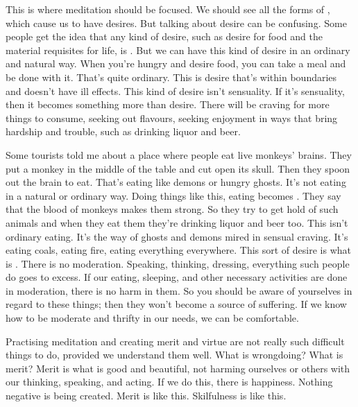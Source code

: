 This is where meditation should be focused. We should see all the forms of , which cause us to have desires. But talking about desire can be confusing. Some people get the idea that any kind of desire, such as desire for food and the material requisites for life, is . But we can have this kind of desire in an ordinary and natural way. When you're hungry and desire food, you can take a meal and be done with it. That's quite ordinary. This is desire that's within boundaries and doesn't have ill effects. This kind of desire isn't sensuality. If it's sensuality, then it becomes something more than desire. There will be craving for more things to consume, seeking out flavours, seeking enjoyment in ways that bring hardship and trouble, such as drinking liquor and beer. 

Some tourists told me about a place where people eat live monkeys' brains. They put a monkey in the middle of the table and cut open its skull. Then they spoon out the brain to eat. That's eating like demons or hungry ghosts. It's not eating in a natural or ordinary way. Doing things like this, eating becomes . They say that the blood of monkeys makes them strong. So they try to get hold of such animals and when they eat them they're drinking liquor and beer too. This isn't ordinary eating. It's the way of ghosts and demons mired in sensual craving. It's eating coals, eating fire, eating everything everywhere. This sort of desire is what is . There is no moderation. Speaking, thinking, dressing, everything such people do goes to excess. If our eating, sleeping, and other necessary activities are done in moderation, there is no harm in them. So you should be aware of yourselves in regard to these things; then they won't become a source of suffering. If we know how to be moderate and thrifty in our needs, we can be comfortable. 

Practising meditation and creating merit and virtue are not really such difficult things to do, provided we understand them well. What is wrongdoing? What is merit? Merit is what is good and beautiful, not harming ourselves or others with our thinking, speaking, and acting. If we do this, there is happiness. Nothing negative is being created. Merit is like this. Skilfulness is like this. 

